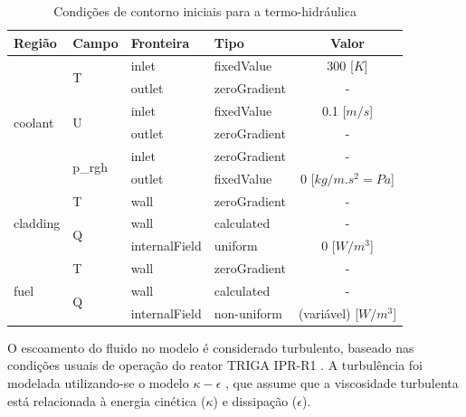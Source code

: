 \begin{table}[htb]
\centering
\caption{Condições de contorno iniciais para a termo-hidráulica}
\label{tab:cc-init}
\begin{tabular}{llllc}
Região                    & Campo                   & Fronteira      & Tipo         & Valor                 \\
\hline
\multirow{6}{*}{coolant}  & \multirow{2}{*}{T}      & inlet         & fixedValue   & 300 [$K$]                  \\
                          &                         & outlet        & zeroGradient & -                     \\
                          & \multirow{2}{*}{U}      & inlet         & fixedValue   & 0.1 {[}$m/s${]}         \\
                          &                         & outlet        & zeroGradient & -                     \\
                          & \multirow{2}{*}{p\_rgh} & inlet         & zeroGradient & -                     \\
                          &                         & outlet        & fixedValue   & 0 {[}$kg/m.s^2 = Pa${]}  \\
\hline
\multirow{3}{*}{cladding} & T                       & wall          & zeroGradient & -                     \\
                          & \multirow{2}{*}{Q}      & wall          & calculated   & -                     \\
                          &                         & internalField & uniform      & 0 {[}$W/m^3${]}          \\
\hline
\multirow{3}{*}{fuel}     & T                       & wall          & zeroGradient & -                     \\
                          & \multirow{2}{*}{Q}      & wall          & calculated   & -                     \\
                          &                         & internalField & non-uniform  & (variável) {[}$W/m^3${]}
\end{tabular}
\end{table}

O escoamento do fluido no modelo é considerado turbulento, baseado nas condições usuais de operação
do reator TRIGA IPR-R1 \cite{Veloso2005}. A turbulência foi modelada utilizando-se o modelo
$\kappa-\epsilon$ \cite{Launder1974}, que assume que a viscosidade turbulenta está relacionada
à energia cinética ($\kappa$) e dissipação ($\epsilon$).

